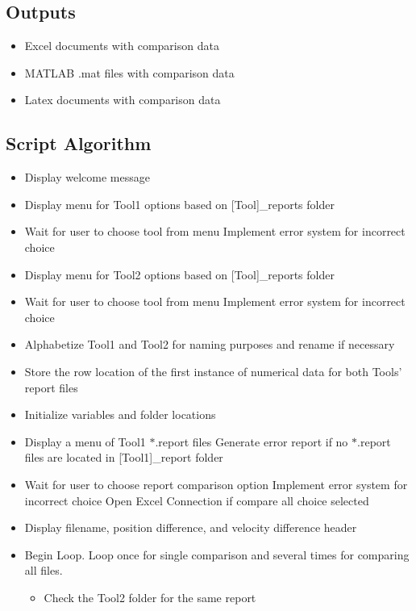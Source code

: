 \subsection{Outputs}
\begin{itemize}
    \item Excel documents with comparison data
    \item MATLAB .mat files with comparison data
    \item Latex documents with comparison data
\end{itemize}
\subsection{Script Algorithm}
\begin{itemize}
    \item Display welcome message
    \item Display menu for Tool1 options based on [Tool]\_reports folder
    \item Wait for user to choose tool from menu
        \subitem Implement error system for incorrect choice
    \item Display menu for Tool2 options based on [Tool]\_reports folder
    \item Wait for user to choose tool from menu
        \subitem Implement error system for incorrect choice
    \item Alphabetize Tool1 and Tool2 for naming purposes and rename
    if necessary
    \item Store the row location of the first instance of numerical
    data for both Tools' report files
    \item Initialize variables and folder locations
    \item Display a menu of Tool1 $*$.report files
        \subitem Generate error report if no $*$.report files are located
    in [Tool1]\_report folder
    \item Wait for user to choose report comparison option
        \subitem Implement error system for incorrect choice
        \subitem Open Excel Connection if compare all choice selected
    \item Display filename, position difference, and velocity difference header
    \item Begin Loop. Loop once for single comparison and several
    times for comparing all files.
    \begin{itemize}
        \item Check the Tool2 folder for the same report

\end{itemize}
\end{itemize}
